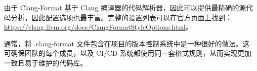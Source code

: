 
由于 Clang-Format 基于 Clang 编译器的代码解析器，因此可以提供最精确的源代码分析，因此配置选项也最丰富。完整的设置列表可以在官方页面上找到： \url{https://clang.llvm.org/docs/ClangFormatStyleOptions.html}。


通常，将 .clang-format 文件包含在项目的版本控制系统中是一种很好的做法。这可确保团队的每个成员，以及 CI/CD 系统都使用同一套格式规则，从而实现更加一致且易于维护的代码库。
























